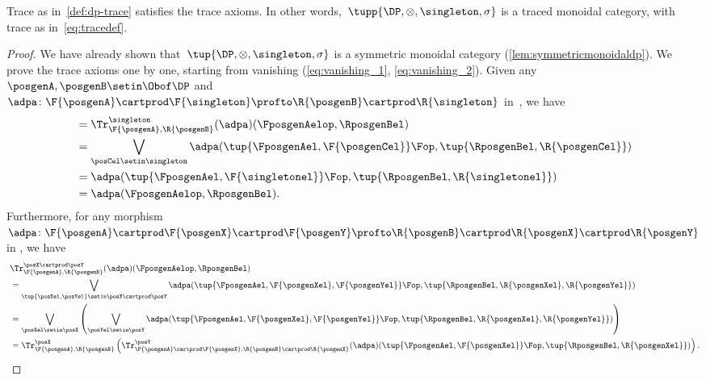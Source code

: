 {\begin{lemma}
    Trace as in~\cref{def:dp-trace} satisfies the trace axioms.
    In other words,~$\tupp{\DP, \otimes, \singleton, \sigma}$ is a traced monoidal category, with trace as in~\cref{eq:tracedef}.
\end{lemma}
\begin{proof}
    We have already shown that~$\tup{\DP,\otimes,\singleton,\sigma}$ is a symmetric monoidal category (\cref{lem:symmetricmonoidaldp}).
    We prove the trace axioms one by one, starting from vanishing (\cref{eq:vanishing_1}, \cref{eq:vanishing_2}).
    Given any~$\posgenA,\posgenB\setin \Obof\DP$ and~$\adpa\colon \F{\posgenA}\cartprod \F{\singleton}\profto \R{\posgenB}\cartprod \R{\singleton}$ in~\DP, we have
    \begin{equation}
        \begin{aligned}
             & = \Tr_{\F{\posgenA},\R{\posgenB}}^{\singleton}(\adpa)(\FposgenAelop,\RposgenBel) \\
             & =\bigvee_{\posCel\setin \singleton}\adpa(\tup{\FposgenAel,\F{\posgenCel}}\Fop,\tup{\RposgenBel,\R{\posgenCel}}) \\
             & =\adpa(\tup{\FposgenAel,\F{\singletonel}}\Fop,\tup{\RposgenBel,\R{\singletonel}}) \\
             & =\adpa(\FposgenAelop,\RposgenBel).
        \end{aligned}
    \end{equation}
    Furthermore, for any morphism~$\adpa\colon \F{\posgenA}\cartprod \F{\posgenX}\cartprod \F{\posgenY} \profto \R{\posgenB}\cartprod \R{\posgenX} \cartprod \R{\posgenY}$ in \DP, we have
    \begin{equation}
        \begin{aligned}
            ~ & \Tr_{\F{\posgenA},\R{\posgenB}}^{\posX\cartprod \posY}(\adpa)(\FposgenAelop,\RposgenBel) \\
              & = \bigvee_{\tup{\posXel,\posYel} \setin \posX\cartprod \posY} \adpa(\tup{\FposgenAel,\F{\posgenXel},\F{\posgenYel}}\Fop,\tup{\RposgenBel,\R{\posgenXel},\R{\posgenYel}}) \\
              & =\bigvee_{\posXel \setin \posX}\left(\bigvee_{\posYel \setin \posY} \adpa(\tup{\FposgenAel,\F{\posgenXel},\F{\posgenYel}}\Fop,\tup{\RposgenBel,\R{\posgenXel},\R{\posgenYel}})\right) \\
              & =\Tr_{\F{\posgenA},\R{\posgenB}}^\posX\left(
            \Tr_{\F{\posgenA}\cartprod \F{\posgenX},\R{\posgenB}\cartprod \R{\posgenX}}^\posY(\adpa)(\tup{\FposgenAel,\F{\posgenXel}}\Fop,\tup{\RposgenBel,\R{\posgenXel}})\right).

\end{aligned}
\end{equation}
\end{proof}}
